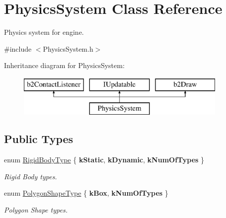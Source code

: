 \hypertarget{class_physics_system}{}\section{Physics\+System Class Reference}
\label{class_physics_system}


Physics system for engine.  




{\ttfamily \#include $<$Physics\+System.\+h$>$}

Inheritance diagram for Physics\+System\+:\begin{figure}[H]
\begin{center}
\leavevmode
\includegraphics[height=2.000000cm]{class_physics_system}
\end{center}
\end{figure}
\subsection*{Public Types}
\begin{DoxyCompactItemize}
\item 
\mbox{\label{class_physics_system_aa9b3a5f5c38063cdc3a78717250a239e}} 
enum \mbox{\hyperlink{class_physics_system_aa9b3a5f5c38063cdc3a78717250a239e}{Rigid\+Body\+Type}} \{ {\bfseries k\+Static}, 
{\bfseries k\+Dynamic}, 
{\bfseries k\+Num\+Of\+Types}
 \}
\begin{DoxyCompactList}\small\item\em Rigid Body types. \end{DoxyCompactList}\item 
\mbox{\label{class_physics_system_ac3b7ef40b19864e4ecdec88af3420a89}} 
enum \mbox{\hyperlink{class_physics_system_ac3b7ef40b19864e4ecdec88af3420a89}{Polygon\+Shape\+Type}} \{ {\bfseries k\+Box}, 
{\bfseries k\+Num\+Of\+Types}
 \}
\begin{DoxyCompactList}\small\item\em Polygon Shape types. \end{DoxyCompactList}\end{DoxyCompactItemize}
